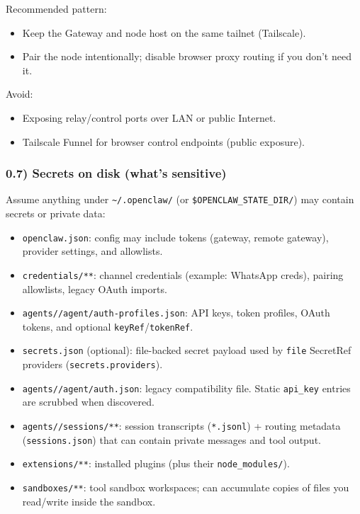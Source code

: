 Recommended pattern:

\begin{itemize}
  \item Keep the Gateway and node host on the same tailnet (Tailscale).
  \item Pair the node intentionally; disable browser proxy routing if you don’t need it.
\end{itemize}


Avoid:

\begin{itemize}
  \item Exposing relay/control ports over LAN or public Internet.
  \item Tailscale Funnel for browser control endpoints (public exposure).
\end{itemize}


\subsubsection{0.7) Secrets on disk (what’s sensitive)}


Assume anything under \texttt{\textasciitilde{}/.openclaw/} (or \texttt{\$OPENCLAW\_STATE\_DIR/}) may contain secrets or private data:

\begin{itemize}
  \item \texttt{openclaw.json}: config may include tokens (gateway, remote gateway), provider settings, and allowlists.
  \item \texttt{credentials/**}: channel credentials (example: WhatsApp creds), pairing allowlists, legacy OAuth imports.
  \item \texttt{agents//agent/auth-profiles.json}: API keys, token profiles, OAuth tokens, and optional \texttt{keyRef}/\texttt{tokenRef}.
  \item \texttt{secrets.json} (optional): file-backed secret payload used by \texttt{file} SecretRef providers (\texttt{secrets.providers}).
  \item \texttt{agents//agent/auth.json}: legacy compatibility file. Static \texttt{api\_key} entries are scrubbed when discovered.
  \item \texttt{agents//sessions/**}: session transcripts (\texttt{*.jsonl}) + routing metadata (\texttt{sessions.json}) that can contain private messages and tool output.
  \item \texttt{extensions/**}: installed plugins (plus their \texttt{node\_modules/}).
  \item \texttt{sandboxes/**}: tool sandbox workspaces; can accumulate copies of files you read/write inside the sandbox.
\end{itemize}


